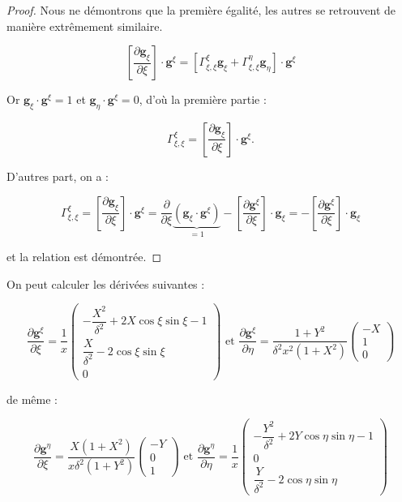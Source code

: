 \begin{proof}
Nous ne démontrons que la première égalité, les autres se retrouvent de manière extrêmement similaire.

$$\left[ \dfrac{\partial \mathbf{g}_{\xi}}{\partial \xi} \right] \cdot \mathbf{g}^{\xi} = \left[ \Gamma_{\xi,\xi}^{\xi} \mathbf{g}_{\xi} + \Gamma_{\xi,\xi}^{\eta} \mathbf{g}_{\eta} \right] \cdot \mathbf{g}^{\xi}$$

Or $\mathbf{g}_{\xi} \cdot \mathbf{g}^{\xi} = 1$ et $\mathbf{g}_{\eta} \cdot \mathbf{g}^{\xi} = 0$, d'où la première partie :

$$\Gamma_{\xi,\xi}^{\xi} = \left[ \dfrac{\partial \mathbf{g}_{\xi}}{\partial \xi} \right] \cdot \mathbf{g}^{\xi}.$$

D'autres part, on a :

$$\Gamma_{\xi,\xi}^{\xi} = \left[ \dfrac{\partial \mathbf{g}_{\xi}}{\partial \xi} \right] \cdot \mathbf{g}^{\xi} = \dfrac{\partial}{\partial \xi}  \underbrace{\left(\mathbf{g}_{\xi} \cdot \mathbf{g}^{\xi}\right)}_{=1}  - \left[ \dfrac{\partial \mathbf{g}^{\xi}}{\partial \xi}  \right] \cdot \mathbf{g}_{\xi} = - \left[ \dfrac{\partial \mathbf{g}^{\xi}}{\partial \xi}  \right] \cdot \mathbf{g}_{\xi}$$

et la relation est démontrée.
\end{proof}

On peut calculer les dérivées suivantes :

\begin{equation}
\dfrac{\partial \mathbf{g}^{\xi}}{\partial \xi} = \dfrac{1}{x} \begin{pmatrix}
-\dfrac{X^2}{\delta^2}+2X \cos \xi \sin \xi -1 \\ \dfrac{X}{\delta^2}-2 \cos \xi \sin \xi \\ 0
\end{pmatrix}
\text{ et }
\dfrac{\partial \mathbf{g}^{\xi}}{\partial \eta} = \dfrac{1+Y^2}{\delta^2 x^2 (1+X^2)} \begin{pmatrix}
-X \\ 1 \\ 0
\end{pmatrix}
\end{equation}

de même :

\begin{equation}
\dfrac{\partial \mathbf{g}^{\eta}}{\partial \xi} = \dfrac{X(1+X^2)}{x \delta^2 (1+Y^2)} \begin{pmatrix}
-Y \\ 0 \\ 1
\end{pmatrix}
\text{ et }
\dfrac{\partial \mathbf{g}^{\eta}}{\partial \eta} = \dfrac{1}{x} \begin{pmatrix}
- \dfrac{Y^2}{\delta^2} + 2 Y \cos \eta \sin \eta -1 \\ 0 \\ \dfrac{Y}{\delta^2}- 2 \cos \eta \sin \eta
\end{pmatrix}
\end{equation}

